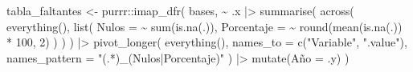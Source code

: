 \documentclass[
  letterpaper,
  DIV=11,
  numbers=noendperiod]{scrartcl}
\newenvironment{Shaded}{\begin{snugshade}}{\end{snugshade}}
\newcommand{\AttributeTok}[1]{\textcolor[rgb]{0.40,0.45,0.13}{#1}}
\newcommand{\DecValTok}[1]{\textcolor[rgb]{0.68,0.00,0.00}{#1}}
\newcommand{\FunctionTok}[1]{\textcolor[rgb]{0.28,0.35,0.67}{#1}}
\newcommand{\NormalTok}[1]{\textcolor[rgb]{0.00,0.23,0.31}{#1}}
\newcommand{\OtherTok}[1]{\textcolor[rgb]{0.00,0.23,0.31}{#1}}
\newcommand{\SpecialCharTok}[1]{\textcolor[rgb]{0.37,0.37,0.37}{#1}}
\newcommand{\StringTok}[1]{\textcolor[rgb]{0.13,0.47,0.30}{#1}}
\begin{document}
\begin{Shaded}
\begin{Highlighting}[]
\NormalTok{tabla\_faltantes }\OtherTok{\textless{}{-}}\NormalTok{ purrr}\SpecialCharTok{::}\FunctionTok{imap\_dfr}\NormalTok{(}
\NormalTok{  bases,}
  \SpecialCharTok{\textasciitilde{}}\NormalTok{ .x }\SpecialCharTok{|\textgreater{}}
    \FunctionTok{summarise}\NormalTok{(}
      \FunctionTok{across}\NormalTok{(}
        \FunctionTok{everything}\NormalTok{(),}
        \FunctionTok{list}\NormalTok{(}
          \AttributeTok{Nulos =} \SpecialCharTok{\textasciitilde{}} \FunctionTok{sum}\NormalTok{(}\FunctionTok{is.na}\NormalTok{(.)),}
          \AttributeTok{Porcentaje =} \SpecialCharTok{\textasciitilde{}} \FunctionTok{round}\NormalTok{(}\FunctionTok{mean}\NormalTok{(}\FunctionTok{is.na}\NormalTok{(.)) }\SpecialCharTok{*} \DecValTok{100}\NormalTok{, }\DecValTok{2}\NormalTok{)}
\NormalTok{        )}
\NormalTok{      )}
\NormalTok{    ) }\SpecialCharTok{|\textgreater{}}
    \FunctionTok{pivot\_longer}\NormalTok{(}
      \FunctionTok{everything}\NormalTok{(),}
      \AttributeTok{names\_to =} \FunctionTok{c}\NormalTok{(}\StringTok{"Variable"}\NormalTok{, }\StringTok{".value"}\NormalTok{),}
      \AttributeTok{names\_pattern =} \StringTok{"(.*)\_(Nulos|Porcentaje)"}
\NormalTok{    ) }\SpecialCharTok{|\textgreater{}}
    \FunctionTok{mutate}\NormalTok{(Año }\OtherTok{=}\NormalTok{ .y)}
\NormalTok{)}


\end{Highlighting}
\end{Shaded}
\end{document}

